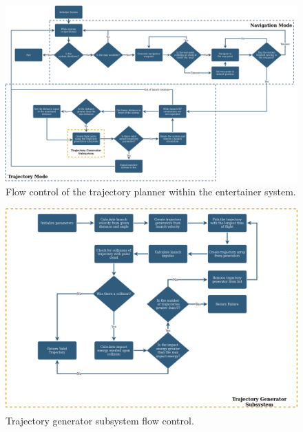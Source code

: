 \documentclass[11pt]{article}
\begin{document}
\begin{figure}[H]
    \centering
        \includegraphics[scale=.35, angle =90]{figures/Trajectory Planner Diagrams.png}
    \caption{Flow control of the trajectory planner within the entertainer system.}
    \label{Trajectory Planner High Level Flow}
\end{figure}

\begin{figure}[H]
    \centering
        \includegraphics[scale=.35, angle =0]{figures/Trajectory Generatory Flow.png}
    \caption{Trajectory generator subsystem flow control.}
    \label{Trajectory Planner Generator Flow}
\end{figure}

\end{document}
